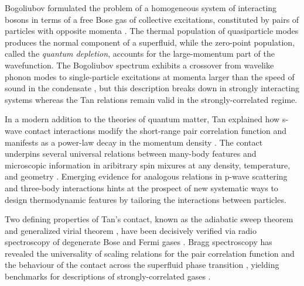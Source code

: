 Bogoliubov formulated the problem of a homogeneous system of interacting bosons in terms of a free Bose gas of collective excitations, constituted by pairs of particles with opposite momenta \cite{vogels02}. The thermal population of quasiparticle modes produces the normal component of a superfluid, while the zero-point population, called the \emph{quantum depletion}, accounts for the large-momentum part of the wavefunction. The Bogoliubov spectrum exhibits a crossover from wavelike phonon modes to single-particle excitations at momenta larger than the speed of sound in the condensate \cite{steinhauer03}, but this description breaks down in strongly interacting systems \cite{lopes17_quasiparticle} whereas the Tan relations remain valid in the strongly-correlated regime.

In a modern addition to the theories of quantum matter, Tan explained how s-wave contact interactions modify the short-range pair correlation function and manifests as a power-law decay in the momentum density \cite{tan08_energetics,tan08_momentum,tan08_virial}. The contact underpins several universal relations between many-body features and microscopic information in aribitrary spin mixures at any density, temperature, and geometry \cite{combescot09,braaten08,braaten11,werner12_boson,werner12_fermion}. Emerging evidence for analogous relations in p-wave scattering \cite{luciuk16} and three-body interactions \cite{fletcher17} hints at the prospect of new systematic ways to design thermodynamic features by tailoring the interactions between particles. 

Two defining properties of Tan's contact, known as the adiabatic sweep theorem \cite{tan08_momentum} and generalized virial theorem \cite{tan08_virial}, have been decisively verified via radio spectroscopy \cite{baym07,punk07,braaten10} of degenerate Bose \cite{wild12} and Fermi gases \cite{stewart10,sagi12}. Bragg spectroscopy has revealed the universality of scaling relations for the pair correlation function \cite{kuhnle10} and the behaviour of the contact across the superfluid phase transition \cite{kuhnle11,mukherjee19,carcy19}, yielding benchmarks for descriptions of strongly-correlated gases \cite{rakhimov20}.

